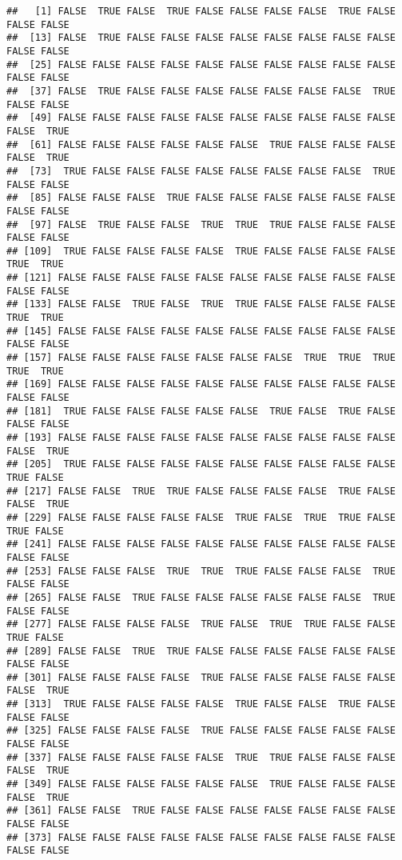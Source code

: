 \documentclass[
]{book}
\begin{document}
\begin{verbatim}
##   [1] FALSE  TRUE FALSE  TRUE FALSE FALSE FALSE FALSE  TRUE FALSE FALSE FALSE
##  [13] FALSE  TRUE FALSE FALSE FALSE FALSE FALSE FALSE FALSE FALSE FALSE FALSE
##  [25] FALSE FALSE FALSE FALSE FALSE FALSE FALSE FALSE FALSE FALSE FALSE FALSE
##  [37] FALSE  TRUE FALSE FALSE FALSE FALSE FALSE FALSE FALSE  TRUE FALSE FALSE
##  [49] FALSE FALSE FALSE FALSE FALSE FALSE FALSE FALSE FALSE FALSE FALSE  TRUE
##  [61] FALSE FALSE FALSE FALSE FALSE FALSE  TRUE FALSE FALSE FALSE FALSE  TRUE
##  [73]  TRUE FALSE FALSE FALSE FALSE FALSE FALSE FALSE FALSE  TRUE FALSE FALSE
##  [85] FALSE FALSE FALSE  TRUE FALSE FALSE FALSE FALSE FALSE FALSE FALSE FALSE
##  [97] FALSE  TRUE FALSE FALSE  TRUE  TRUE  TRUE FALSE FALSE FALSE FALSE FALSE
## [109]  TRUE FALSE FALSE FALSE FALSE  TRUE FALSE FALSE FALSE FALSE  TRUE  TRUE
## [121] FALSE FALSE FALSE FALSE FALSE FALSE FALSE FALSE FALSE FALSE FALSE FALSE
## [133] FALSE FALSE  TRUE FALSE  TRUE  TRUE FALSE FALSE FALSE FALSE  TRUE  TRUE
## [145] FALSE FALSE FALSE FALSE FALSE FALSE FALSE FALSE FALSE FALSE FALSE FALSE
## [157] FALSE FALSE FALSE FALSE FALSE FALSE FALSE  TRUE  TRUE  TRUE  TRUE  TRUE
## [169] FALSE FALSE FALSE FALSE FALSE FALSE FALSE FALSE FALSE FALSE FALSE FALSE
## [181]  TRUE FALSE FALSE FALSE FALSE FALSE  TRUE FALSE  TRUE FALSE FALSE FALSE
## [193] FALSE FALSE FALSE FALSE FALSE FALSE FALSE FALSE FALSE FALSE FALSE  TRUE
## [205]  TRUE FALSE FALSE FALSE FALSE FALSE FALSE FALSE FALSE FALSE  TRUE FALSE
## [217] FALSE FALSE  TRUE  TRUE FALSE FALSE FALSE FALSE  TRUE FALSE FALSE  TRUE
## [229] FALSE FALSE FALSE FALSE FALSE  TRUE FALSE  TRUE  TRUE FALSE  TRUE FALSE
## [241] FALSE FALSE FALSE FALSE FALSE FALSE FALSE FALSE FALSE FALSE FALSE FALSE
## [253] FALSE FALSE FALSE  TRUE  TRUE  TRUE FALSE FALSE FALSE  TRUE FALSE FALSE
## [265] FALSE FALSE  TRUE FALSE FALSE FALSE FALSE FALSE FALSE  TRUE FALSE FALSE
## [277] FALSE FALSE FALSE FALSE  TRUE FALSE  TRUE  TRUE FALSE FALSE  TRUE FALSE
## [289] FALSE FALSE  TRUE  TRUE FALSE FALSE FALSE FALSE FALSE FALSE FALSE FALSE
## [301] FALSE FALSE FALSE FALSE  TRUE FALSE FALSE FALSE FALSE FALSE FALSE  TRUE
## [313]  TRUE FALSE FALSE FALSE FALSE  TRUE FALSE FALSE  TRUE FALSE FALSE FALSE
## [325] FALSE FALSE FALSE FALSE  TRUE FALSE FALSE FALSE FALSE FALSE FALSE FALSE
## [337] FALSE FALSE FALSE FALSE FALSE  TRUE  TRUE FALSE FALSE FALSE FALSE  TRUE
## [349] FALSE FALSE FALSE FALSE FALSE FALSE  TRUE FALSE FALSE FALSE FALSE  TRUE
## [361] FALSE FALSE  TRUE FALSE FALSE FALSE FALSE FALSE FALSE FALSE FALSE FALSE
## [373] FALSE FALSE FALSE FALSE FALSE FALSE FALSE FALSE FALSE FALSE FALSE FALSE

\end{verbatim}
\end{document}
